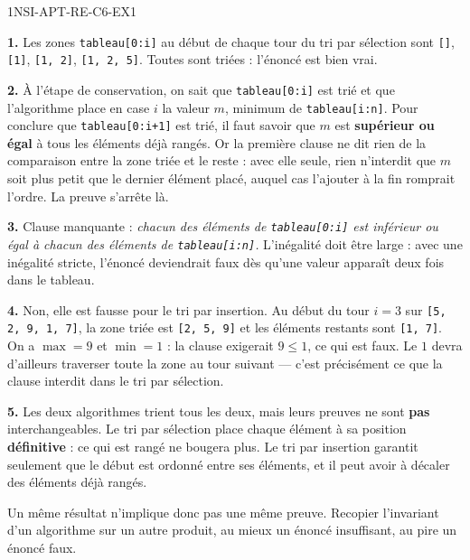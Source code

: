 \begin{corrige}{1NSI-APT-RE-C6-EX1}

\textbf{1.} Les zones \lstinline{tableau[0:i]} au début de chaque tour du tri par sélection
sont \lstinline{[]}, \lstinline{[1]}, \lstinline{[1, 2]}, \lstinline{[1, 2, 5]}. Toutes sont
triées : l'énoncé est bien vrai.

\textbf{2.} À l'étape de conservation, on sait que \lstinline{tableau[0:i]} est trié et que
l'algorithme place en case $i$ la valeur $m$, minimum de \lstinline{tableau[i:n]}. Pour
conclure que \lstinline{tableau[0:i+1]} est trié, il faut savoir que $m$ est
\textbf{supérieur ou égal} à tous les éléments déjà rangés. Or la première clause ne dit
rien de la comparaison entre la zone triée et le reste : avec elle seule, rien n'interdit
que $m$ soit plus petit que le dernier élément placé, auquel cas l'ajouter à la fin
romprait l'ordre. La preuve s'arrête là.

\textbf{3.} Clause manquante : \emph{chacun des éléments de \lstinline{tableau[0:i]} est
inférieur ou égal à chacun des éléments de \lstinline{tableau[i:n]}.} L'inégalité doit être
large : avec une inégalité stricte, l'énoncé deviendrait faux dès qu'une valeur apparaît
deux fois dans le tableau.

\textbf{4.} Non, elle est fausse pour le tri par insertion. Au début du tour $i=3$ sur
\lstinline{[5, 2, 9, 1, 7]}, la zone triée est \lstinline{[2, 5, 9]} et les éléments
restants sont \lstinline{[1, 7]}. On a $\max = 9$ et $\min = 1$ : la clause exigerait
$9 \leqslant 1$, ce qui est faux. Le $1$ devra d'ailleurs traverser toute la zone au tour
suivant — c'est précisément ce que la clause interdit dans le tri par sélection.

\textbf{5.} Les deux algorithmes trient tous les deux, mais leurs preuves ne sont
\textbf{pas} interchangeables. Le tri par sélection place chaque élément à sa position
\textbf{définitive} : ce qui est rangé ne bougera plus. Le tri par insertion garantit
seulement que le début est ordonné entre ses éléments, et il peut avoir à décaler des
éléments déjà rangés.

Un même résultat n'implique donc pas une même preuve. Recopier l'invariant d'un algorithme
sur un autre produit, au mieux un énoncé insuffisant, au pire un énoncé faux.

\end{corrige}
